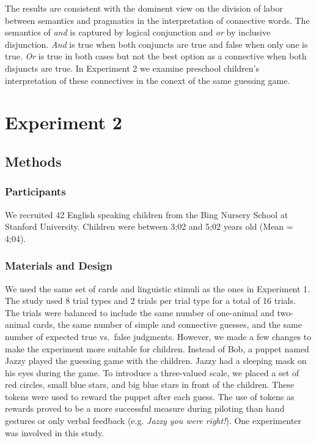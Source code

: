\documentclass[10pt, letterpaper]{article}
\begin{document}
The results are consistent with the dominent view on the division of
labor between semantics and pragmatics in the interpretation of
connective words. The semantics of \emph{and} is captured by logical
conjunction and \emph{or} by inclusive disjunction. \emph{And} is true
when both conjuncts are true and false when only one is true. \emph{Or}
is true in both cases but not the best option as a connective when both
disjuncts are true. In Experiment 2 we examine preschool children's
interpretation of these connectives in the conext of the same guessing
game.

\section{Experiment 2}\label{experiment-2}

\subsection{Methods}\label{methods-1}

\subsubsection{Participants}\label{participants-1}

We recruited 42 English speaking children from the Bing Nursery School
at Stanford University. Children were between 3;02 and 5;02 years old
(Mean = 4;04).

\subsubsection{Materials and Design}\label{materials-and-design-1}

We used the same set of cards and linguistic stimuli as the ones in
Experiment 1. The study used 8 trial types and 2 trials per trial type
for a total of 16 trials. The trials were balanced to include the same
number of one-animal and two-animal cards, the same number of simple and
connective guesses, and the same number of expected true vs.~false
judgments. However, we made a few changes to make the experiment more
suitable for children. Instead of Bob, a puppet named Jazzy played the
guessing game with the children. Jazzy had a sleeping mask on his eyes
during the game. To introduce a three-valued scale, we placed a set of
red circles, small blue stars, and big blue stars in front of the
children. These tokens were used to reward the puppet after each guess.
The use of tokens as rewards proved to be a more successful measure
during piloting than hand gestures or only verbal feedback (e.g.
\emph{Jazzy you were right!}). One experimenter was involved in this
study.
\end{document}
